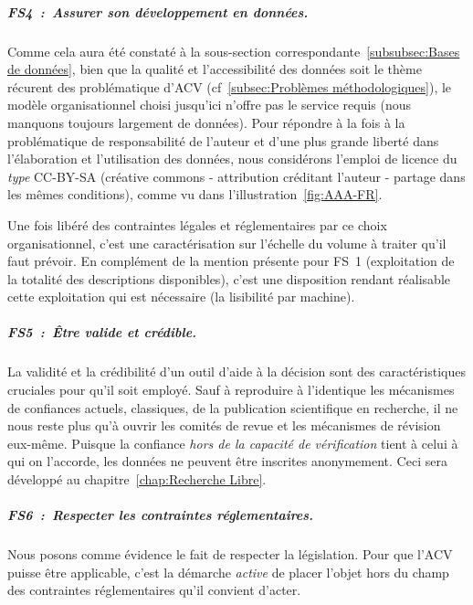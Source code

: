 \subparagraph{FS4~:~Assurer son développement en données.}
Comme cela aura été constaté à la sous-section correspondante~\ref{subsubsec:Bases de données}, bien que la qualité et l'accessibilité des données soit le thème récurent des problématique d'\gls{ACV} (cf~\ref{subsec:Problèmes méthodologiques}), le modèle organisationnel choisi jusqu'ici n'offre pas le service requis (nous manquons toujours largement de données).
Pour répondre à la fois à la problématique de responsabilité de l'auteur et d'une plus grande liberté dans l'élaboration et l'utilisation des données, nous considérons l'emploi de licence du \emph{type} CC-BY-SA (créative commons - attribution créditant l'auteur - partage dans les mêmes conditions), comme vu dans l'illustration~\ref{fig:AAA-FR}.

Une fois libéré des contraintes légales et réglementaires par ce choix organisationnel, c'est une caractérisation sur l'échelle du volume à traiter qu'il faut prévoir.
En complément de la mention présente pour FS~1 (exploitation de la totalité des descriptions disponibles), c'est une disposition rendant réalisable cette exploitation qui est nécessaire (la lisibilité par machine).

\subparagraph{FS5~:~Être valide et crédible.}
La validité et la crédibilité d'un outil d'aide à la décision sont des caractéristiques cruciales pour qu'il soit employé.
Sauf à reproduire à l'identique les mécanismes de confiances actuels, classiques, de la publication scientifique en recherche, il ne nous reste plus qu'à ouvrir les comités de revue et les mécanismes de révision eux-même.
Puisque la confiance \textit{hors de la capacité de vérification} tient à celui à qui on l'accorde, les données ne peuvent être inscrites anonymement.
Ceci sera développé au chapitre~\ref{chap:Recherche Libre}.
\subparagraph{FS6~:~Respecter les contraintes réglementaires.}
Nous posons comme évidence le fait de respecter la législation. Pour que l'ACV puisse être applicable, c'est la démarche \textit{active} de placer l'objet hors du champ des contraintes réglementaires qu'il convient d'acter.

